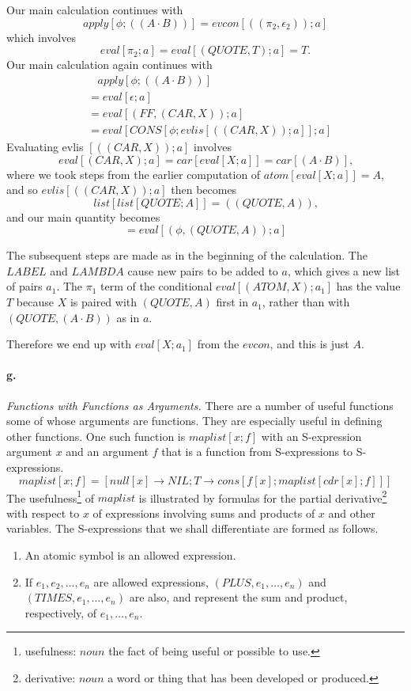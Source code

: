 \documentclass[11pt, a4paper]{article}
\begin{document}
Our main calculation continues with
$$ apply[\phi; ((A \cdot B))] = evcon[((\pi_2, \epsilon_2)); a] $$
which involves
$$ eval[\pi_2; a] = eval[(QUOTE, T); a] = T \text{.} $$
Our main calculation again continues with
\begin{align*}
  &\ \ \ \ apply[\phi; ((A \cdot B))] \\
  &= eval[\epsilon; a]                \\
  &= eval[(FF, (CAR, X)); a]          \\
  &= eval[CONS[\phi; evlis[((CAR, X)); a]]; a]
\end{align*}
Evaluating evlis $[((CAR, X)); a]$ involves
$$ eval[(CAR, X); a] = car[eval[X; a]] = car[(A \cdot B)] \text{,} $$
where we took steps from the earlier computation of $atom[eval[X; a]] = A$, and
so $evlis[((CAR, X)); a]$ then becomes
$$ list[list[QUOTE; A]] = ((QUOTE, A)) \text{,} $$
and our main quantity becomes
$$ = eval[(\phi, (QUOTE, A)); a] $$

The subsequent steps are made as in the beginning of the calculation. The
$LABEL$ and $LAMBDA$ cause new pairs to be added to $a$, which gives a new list
of pairs $a_1$. The $\pi_1$ term of the conditional $eval[(ATOM, X); a_1]$ has
the value $T$ because $X$ is paired with $(QUOTE, A)$ first in $a_1$, rather
than with $(QUOTE, (A \cdot B))$ as in $a$.

Therefore we end up with $eval[X; a_1]$ from the $evcon$, and this is just $A$.

\paragraph{g.}\textit{Functions with Functions as Arguments.}
There are a number of useful functions some of whose arguments are
functions. They are especially useful in defining other functions. One such
function is $maplist[x; f]$ with an S-expression argument $x$ and an argument
$f$ that is a function from S-expressions to S-expressions.
$$ maplist[x; f] = [null[x] \to NIL; T \to cons[f[x]; maplist[cdr[x]; f]]] $$
The
usefulness\footnote{usefulness: $noun$ the fact of being useful or possible to use.}
of $maplist$ is illustrated by formulas for the partial
derivative\footnote{derivative: $noun$ a word or thing that has been developed
  or produced.}
with respect to $x$ of expressions involving sums and products of $x$
and other variables. The S-expressions that we shall differentiate are formed as
follows.
\begin{enumerate}
\item An atomic symbol is an allowed expression.
\item If $e_1, e_2, \ldots, e_n$ are allowed expressions, $(PLUS, e_1, \ldots,
  e_n)$ and \\$(TIMES, e_1, \ldots, e_n)$ are also, and represent the sum and
  product, respectively, of $e_1, \ldots, e_n$.
\end{enumerate}
\end{document}
